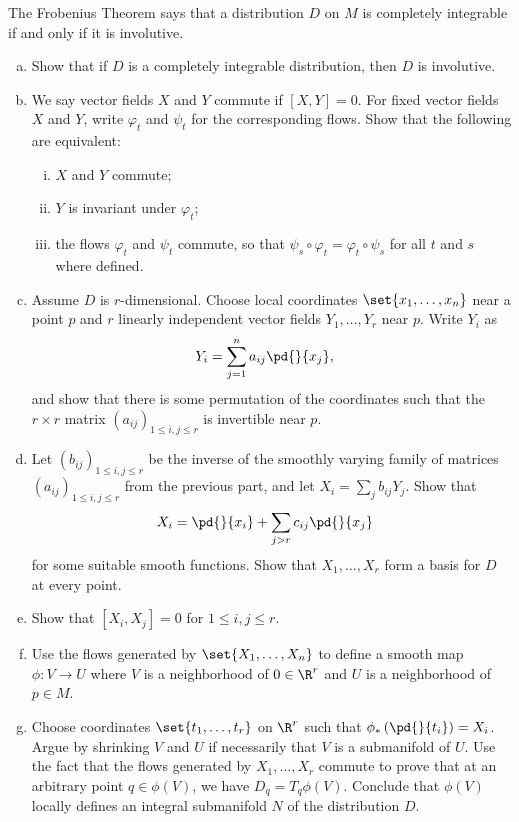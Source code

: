 \documentclass[10pt]{mypackage}
\begin{document}
\begin{problem}[Problem 3]
  The Frobenius Theorem says that a distribution $D$ on $M$ is completely integrable if and only if it is involutive.
  \begin{enumerate}[(a)]
    \item Show that if $D$ is a completely integrable distribution, then $D$ is involutive.
    \item We say vector fields $X$ and $Y$ commute if $ \left[ X,Y \right] = 0 $. For fixed vector fields $X$ and $Y$, write $\varphi_t$ and $\psi_t$ for the corresponding flows. Show that the following are equivalent:
      \begin{enumerate}[(i)]
        \item $X$ and $Y$ commute;
        \item $Y$ is invariant under $\varphi_t$;
        \item the flows $\varphi_t$ and $\psi_t$ commute, so that $\psi_s\circ \varphi_t = \varphi_t\circ \psi_s$ for all $t$ and $s$ where defined.
      \end{enumerate}
    \item Assume $D$ is $r$-dimensional. Choose local coordinates $\set{x_1,\dots,x_n}$ near a point $p$ and $r$ linearly independent vector fields $Y_1,\dots,Y_r$ near $p$. Write $Y_i$ as
      \begin{align*}
        Y_{i} &= \sum_{j=1}^{n} a_{ij} \pd{}{x_j},
      \end{align*}
      and show that there is some permutation of the coordinates such that the $r\times r$ matrix $\left( a_{ij} \right)_{1\leq i,j\leq r}$ is invertible near $p$.
    \item Let $\left( b_{ij} \right)_{1\leq i,j\leq r}$ be the inverse of the smoothly varying family of matrices $\left( a_{ij} \right)_{1\leq i,j\leq r}$ from the previous part, and let $X_i = \sum_{j}b_{ij}Y_j$. Show that
      \begin{align*}
        X_i &= \pd{}{x_i} + \sum_{j > r} c_{ij} \pd{}{x_j}
      \end{align*}
      for some suitable smooth functions. Show that $X_1,\dots,X_r$ form a basis for $D$ at every point.
    \item Show that $\left[ X_i,X_j \right] = 0$ for $1\leq i,j\leq r$.
    \item Use the flows generated by $\set{X_1,\dots,X_n}$ to define a smooth map $\phi\colon V\rightarrow U$ where $V$ is a neighborhood of $0\in\R^{r}$ and $U$ is a neighborhood of $p\in M$.
    \item Choose coordinates $\set{t_1,\dots,t_r}$ on $\R^{r}$ such that $\phi_{\ast}\left( \pd{}{t_i} \right) = X_i$. Argue by shrinking $V$ and $U$ if necessarily that $V$ is a submanifold of $U$. Use the fact that the flows generated by $X_1,\dots,X_r$ commute to prove that at an arbitrary point $q\in \phi(V)$, we have $D_q = T_q\phi(V)$. Conclude that $\phi(V)$ locally defines an integral submanifold $N$ of the distribution $D$.
  \end{enumerate}
\end{problem}
\end{document}
